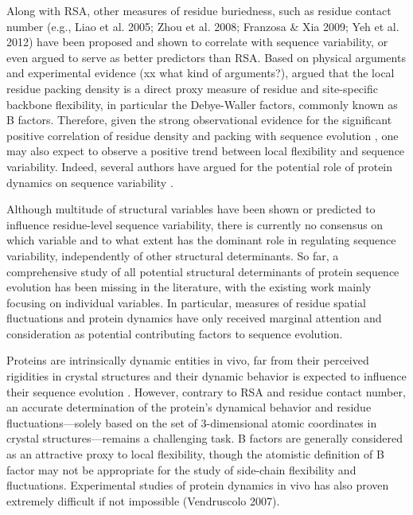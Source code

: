 \documentclass[12pt]{article}
\begin{document}
Along with RSA, other measures of residue buriedness, such as residue contact number {\color{red}(e.g., Liao et al. 2005; Zhou et al. 2008; Franzosa \& Xia 2009; Yeh et al. 2012)} have been proposed and shown to correlate with sequence variability, or even argued to serve as better predictors than RSA.  Based on physical arguments and experimental evidence (xx what kind of arguments?), \citet{Halle2002} argued that the local residue packing density is a direct proxy measure of residue and site-specific backbone flexibility, in particular the Debye-Waller factors, commonly known as B factors. Therefore, given the strong observational evidence for the significant positive correlation of residue density and packing with sequence evolution \citep{Yehetal2014}, one may also expect to observe a positive trend between local flexibility and sequence variability. Indeed, several authors have argued for the potential role of protein dynamics on sequence variability \citep{LiuBahar2012,NevinGereketal2013}.
	
Although multitude of structural variables have been shown or predicted to influence residue-level sequence variability, there is currently no consensus on which variable and to what extent has the dominant role in regulating sequence variability, independently of other structural determinants. So far, a comprehensive study of all potential structural determinants of protein sequence evolution has been missing in the literature, with the existing work mainly focusing on individual variables. In particular, measures of residue spatial fluctuations and protein dynamics have only received marginal attention and consideration as potential contributing factors to sequence evolution.

Proteins are intrinsically dynamic entities in vivo, far from their perceived rigidities in crystal structures and their dynamic behavior is expected to influence their sequence evolution \citep{MarshTeichmann2014}.  However, contrary to RSA and residue contact number, an accurate determination of the protein's dynamical behavior and residue fluctuations---solely based on the set of 3-dimensional atomic coordinates in crystal structures---remains a challenging task. B factors are generally considered as an attractive proxy to local flexibility, though the atomistic definition of B factor may not be appropriate for the study of side-chain flexibility and fluctuations. Experimental studies of protein dynamics in vivo has also proven extremely difficult if not impossible ({\color{red}Vendruscolo 2007}).
\end{document}
